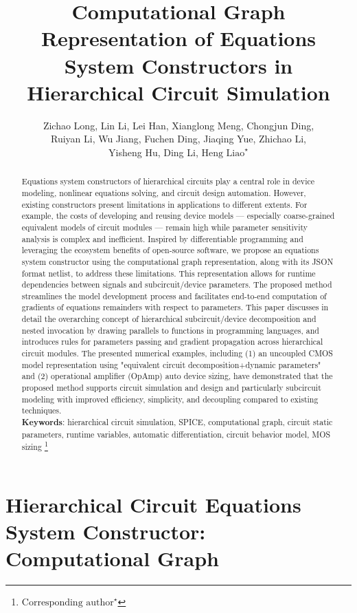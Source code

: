 \documentclass[a4paper,12pt]{article}
\author{Zichao Long, Lin Li, Lei Han, Xianglong Meng, Chongjun Ding,\\
Ruiyan Li, Wu Jiang, Fuchen Ding, Jiaqing Yue, Zhichao Li,\\
Yisheng Hu, Ding Li, $\text{Heng Liao}^\star$}
\title{Computational Graph Representation of Equations System Constructors in Hierarchical Circuit Simulation}
\date{}
\newcommand\blfootnote[1]{%
  \begingroup
  \renewcommand\thefootnote{}\footnote{#1}%
  \addtocounter{footnote}{-1}%
  \endgroup
}
\begin{document}
\maketitle
\vspace{-5.7em}
\begin{abstract}
  Equations system constructors of hierarchical circuits play a central role in
  device modeling, nonlinear equations solving, and circuit design automation.
  However, existing constructors present limitations in applications to different
  extents. For example, the costs of developing and reusing device models ---
  especially coarse-grained equivalent models of circuit modules ---
  remain high while parameter sensitivity analysis is complex and inefficient.
  Inspired by differentiable programming and
  leveraging the ecosystem benefits of open-source software, we propose
  an equations system constructor using the computational graph representation,
  along with its JSON format netlist, to address these limitations.
  This representation allows for runtime dependencies between signals and
  subcircuit/device parameters. The proposed method streamlines the model
  development process and facilitates end-to-end computation of gradients of
  equations remainders with respect to parameters.
  This paper discusses in detail the overarching concept of hierarchical
  subcircuit/device decomposition and nested invocation by drawing parallels to
  functions in programming languages, and introduces
  rules for parameters passing and gradient propagation across
  hierarchical circuit modules.
  The presented numerical examples, including (1) an uncoupled CMOS model
  representation using "equivalent circuit decomposition+dynamic parameters"
  and (2) operational amplifier (OpAmp) auto device sizing, have demonstrated
  that the proposed method supports circuit simulation and design and
  particularly subcircuit modeling with improved efficiency, simplicity,
  and decoupling compared to existing techniques.
  \\
  {\bf{Keywords}}: hierarchical circuit simulation, SPICE, computational graph,
  circuit static parameters, runtime variables, automatic differentiation,
  circuit behavior model, MOS sizing
\blfootnote{$\text{Corresponding author}^\star$}
\end{abstract}

\newpage
\tableofcontents

\newpage

\section[Hierarchical Circuit Equations System Constructor: Computational Graph]{Hierarchical Circuit Equations System Constructor: \\ Computational Graph}\label{sec:Joanna}

\end{document}
